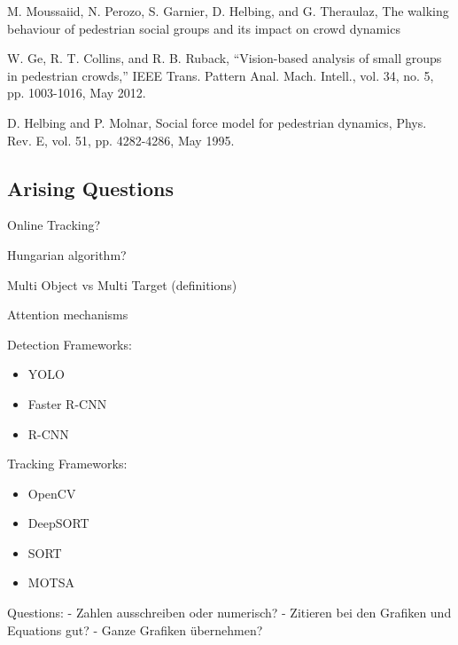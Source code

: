 M. Moussaiid, N. Perozo, S. Garnier, D. Helbing, and G. Theraulaz, The walking behaviour of pedestrian social groups and its impact on crowd dynamics

W. Ge, R. T. Collins, and R. B. Ruback, “Vision-based analysis of small groups in pedestrian crowds,” IEEE Trans. Pattern Anal. Mach. Intell., vol. 34, no. 5, pp. 1003-1016, May 2012.

D. Helbing and P. Molnar, Social force model for pedestrian dynamics, Phys. Rev. E, vol. 51, pp. 4282-4286, May 1995.

\subsection{Arising Questions}

Online Tracking?

Hungarian algorithm?

Multi Object vs Multi Target (definitions)

Attention mechanisms

Detection Frameworks:
\begin{itemize}
    \item YOLO
    \item Faster R-CNN
    \item R-CNN
\end{itemize}

Tracking Frameworks:
\begin{itemize}
    \item OpenCV
    \item DeepSORT
    \item SORT
    \item MOTSA
\end{itemize}

Questions:
- Zahlen ausschreiben oder numerisch?
- Zitieren bei den Grafiken und Equations gut?
- Ganze Grafiken übernehmen?